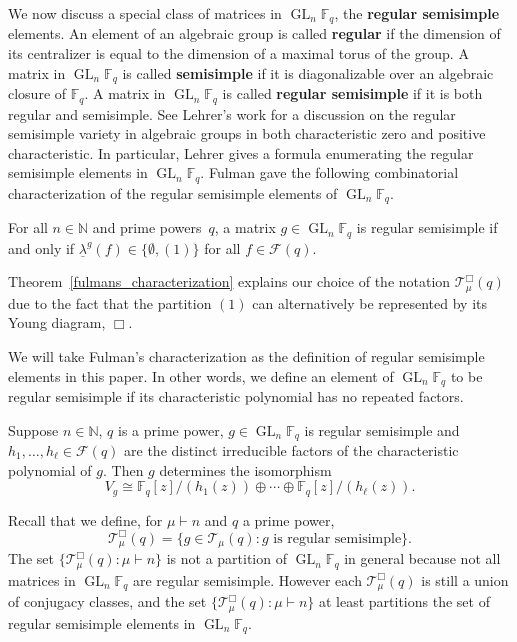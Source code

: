\documentclass[Unicode,ALCO]{cedram}
\DeclareMathOperator{\GL}{GL}
\newcommand{\F}{\mathbb{F}}
\newcommand{\CF}{\mathcal{F}}
\newcommand{\N}{\mathbb{N}}
\newcommand{\CT}{\mathcal{T}}
\newcommand{\myemph}{\textbf}
\newcommand{\ulambda}{{\underline{\lambda}}}
\begin{document}
We now discuss a special class of matrices in $\GL_n \F_q$, the \myemph{regular semisimple} elements.
An element of an algebraic group is called \myemph{regular} if the dimension of its centralizer is equal to the dimension of a maximal torus of the group.
A matrix in $\GL_n \F_q$ is called \myemph{semisimple} if it is diagonalizable over an algebraic closure of $\F_q$.
A matrix in $\GL_n \F_q$ is called \myemph{regular semisimple} if it is both regular and semisimple.
See Lehrer's work \cite{lehrer} for a discussion on the regular semisimple variety in algebraic groups in both characteristic zero and positive characteristic.
In particular, Lehrer gives a formula \cite[Corollary~8.5]{lehrer} enumerating the regular semisimple elements in \(\GL_n \F_q\).
Fulman gave the following combinatorial characterization of the regular semisimple elements of $\GL_n \F_q$.

\begin{theorem}
\label{fulmans_characterization}
For all \(n \in \N\) and prime powers~\(q\), a matrix $g \in \GL_n \F_q$ is regular semisimple if and only if $\ulambda^g (f) \in \{\emptyset, (1)\}$ for all $f \in \CF (q)$.
\end{theorem}

\begin{remark}
	Theorem~\ref{fulmans_characterization} explains our choice of the notation \(\CT^\Box_\mu (q)\) due to the fact that the partition \((1)\) can alternatively be represented by its Young diagram, \(\Box\).
\end{remark}

We will take Fulman's characterization as the definition of regular semisimple elements in this paper.
In other words, we define an element of \(\GL_n \F_q\) to be regular semisimple if its characteristic polynomial has no repeated factors.

\begin{corollary}
\label{rs_rcf_corollary}
Suppose \(n \in \N\), \(q\) is a prime power, \(g \in \GL_n \F_q\) is regular semisimple and \(h_1,\ldots,h_\ell \in \CF (q)\) are the distinct irreducible factors of the characteristic polynomial of \(g\).
Then \(g\) determines the isomorphism
\begin{equation}
\label{rs_rcf}
V_g \cong
{\F_q[z]} / {(h_1(z))}
\oplus
\cdots
\oplus
{\F_q[z]} / {(h_{\ell} (z))}.
\end{equation}
\end{corollary}


Recall that we define, for \(\mu \vdash n\) and \(q\) a prime power,
\begin{equation}
\CT^\Box_\mu (q)
=
\{g \in \CT_\mu (q) : g \text{ is regular semisimple}\}.
\end{equation}
The set $\{ \CT_\mu^\Box (q) : \mu \vdash n \}$ is not a partition of $\GL_n \F_q$ in general because not all matrices in $\GL_n \F_q$ are regular semisimple.
However each $\CT^\Box_\mu (q)$ is still a union of conjugacy classes, and the set $\{\CT^\Box_\mu (q) : \mu \vdash n\}$ at least partitions the set of regular semisimple elements in $\GL_n \F_q$.
\end{document}
